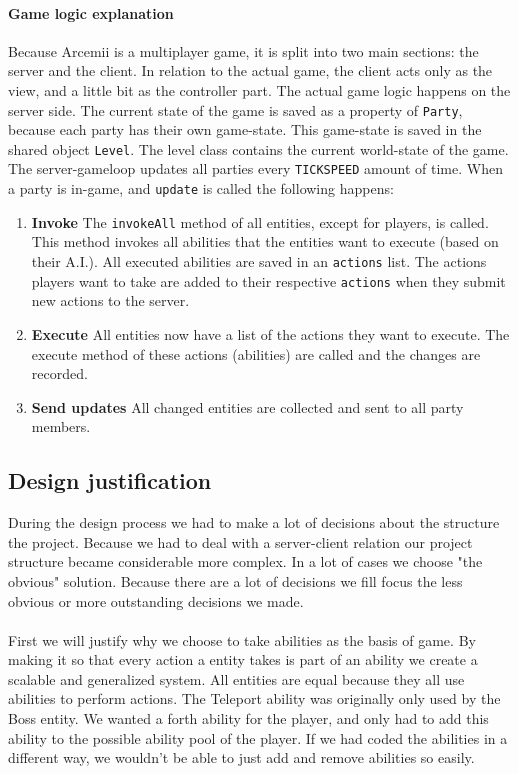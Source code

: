 \documentclass[../main.tex]{subfiles}
\begin{document}
        \paragraph{Game logic explanation}
        Because Arcemii is a multiplayer game, it is split into two main sections: the server and the client. In relation to the actual game, the client acts only as the view, and a little bit as the controller part. The actual game logic happens on the server side. The current state of the game is saved as a property of \texttt{Party}, because each party has their own game-state. This game-state is saved in the shared object \texttt{Level}. The level class contains the current world-state of the game. The server-gameloop updates all parties every \texttt{TICKSPEED} amount of time. When a party is in-game, and \texttt{update} is called the following happens:

        \begin{enumerate}
            \item \textbf{Invoke} The \texttt{invokeAll} method of all entities, except for players, is called. This method invokes all abilities that the entities want to execute (based on their A.I.). All executed abilities are saved in an \texttt{actions} list. The actions players want to take are added to their respective \texttt{actions} when they submit new actions to the server.
            \item \textbf{Execute} All entities now have a list of the actions they want to execute. The execute method of these actions (abilities) are called and the changes are recorded.
            \item \textbf{Send updates} All changed entities are collected and sent to all party members.
        \end{enumerate}
        
    \pagebreak 
	\subsection{Design justification}
    During the design process we had to make a lot of decisions about the structure the project. Because we had to deal with a server-client relation our project structure became considerable more complex. In a lot of cases we choose "the obvious" solution. Because there are a lot of decisions we fill focus the less obvious or more outstanding decisions we made.
    \paragraph{}
    First we will justify why we choose to take abilities as the basis of game. By making it so that every action a entity takes is part of an ability we create a scalable and generalized system. All entities are equal because they all use abilities to perform actions. The Teleport ability was originally only used by the Boss entity. We wanted a forth ability for the player, and only had to add this ability to the possible ability pool of the player. If we had coded the abilities in a different way, we wouldn't be able to just add and remove abilities so easily.
\end{document}
